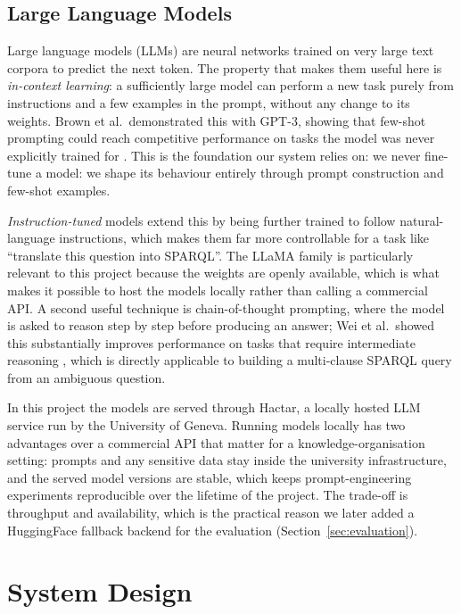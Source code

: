 \documentclass[11pt,a4paper]{article}
\begin{document}
\subsection{Large Language Models}
\label{sec:llms}
Large language models (LLMs) are neural networks trained on very large
text corpora to predict the next token. The property that makes them
useful here is \emph{in-context learning}: a sufficiently large model
can perform a new task purely from instructions and a few examples in
the prompt, without any change to its weights. Brown et al.\
demonstrated this with GPT-3, showing that few-shot prompting could
reach competitive performance on tasks the model was never explicitly
trained for \cite{brown2020gpt3}. This is the foundation our system
relies on: we never fine-tune a model: we shape its behaviour entirely
through prompt construction and few-shot examples.

\emph{Instruction-tuned} models extend this by being further trained
to follow natural-language instructions, which makes them far more
controllable for a task like ``translate this question into SPARQL''.
The LLaMA family \cite{touvron2023llama,touvron2023llama2} is
particularly relevant to this project because the weights are openly
available, which is what makes it possible to host the models locally
rather than calling a commercial API. A second useful technique is
chain-of-thought prompting, where the model is asked to reason
step by step before producing an answer; Wei et al.\ showed this
substantially improves performance on tasks that require intermediate
reasoning \cite{wei2022cot}, which is directly applicable to building
a multi-clause SPARQL query from an ambiguous question.

In this project the models are served through Hactar, a locally hosted
LLM service run by the University of Geneva. Running models locally has
two advantages over a commercial API that matter for a knowledge-organisation
setting: prompts and any sensitive data stay inside the
university infrastructure, and the served model versions are stable,
which keeps prompt-engineering experiments reproducible over the
lifetime of the project. The trade-off is throughput and availability,
which is the practical reason we later added a HuggingFace fallback
backend for the evaluation (Section~\ref{sec:evaluation}).


\section{System Design}
\label{sec:system}
\end{document}
